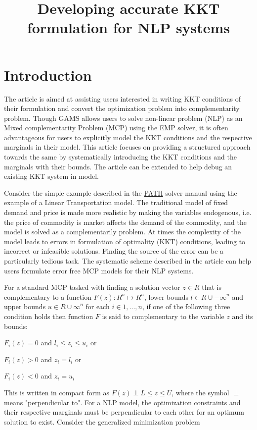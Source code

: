 \documentclass{article}
\title{Developing accurate KKT formulation for NLP systems}
\begin{document}
\section{Introduction}

The article is aimed at assisting users interested in writing KKT conditions of their formulation and convert the optimization problem into
complementarity problem. Though GAMS allows users to solve non-linear problem (NLP) as an Mixed complementarity Problem (MCP) using the
EMP solver, it is often advantageous for users to explicitly model the KKT conditions and the respective marginals in their model.
This article focuses on providing a structured approach towards the same by systematically introducing the KKT
conditions and the marginals with their bounds. The article can be extended to help debug an existing KKT system in model.


Consider the simple example described in the \href{https://www.gams.com/latest/docs/S_PATH.html}{PATH} solver manual using the example of a Linear Transportation model.
The traditional model of fixed demand and price is made more realistic by making the variables endogenous, i.e. the price of commodity is market affects the demand of the
commodity, and the model is solved as a complementarily problem.  At times the complexity of the model leads to errors in formulation of optimality (KKT) conditions,
leading to incorrect or infeasible solutions. Finding the source of the error can be a particularly tedious task. The systematic scheme described in the article can
help users formulate error free MCP models for their NLP systems.

For a standard MCP tasked with finding a solution vector  $z \in \!R$ that is complementary to a function $F(z) : {\!R}^n \mapsto {\!R}^n$,
lower bounds $ l \in { \!R \cup {-\infty}}^n$ and upper bounds $ u \in { \!R \cup {\infty}}^n$ for each $ i \in {1,...,n}$, if one of the following three
condition holds then function $F$ is said to complementary to the variable $z$ and its bounds:

 \centerline{$F_{i}(z) = 0$  and  $ l_i \leq z_i \leq u_i $   or}
 \centerline{$F_{i}(z) > 0$  and  $ z_i = l_i$  or }
 \centerline{ $F_{i}(z) < 0$  and  $ z_i = u_i$ }

\noindent This is written in compact form as $ F(z) \perp L \leq z \leq U $, where the symbol $\perp$ means "perpendicular to". For a NLP model,
the optimization constraints and their respective marginals must be perpendicular to each other for an optimum solution to exist. Consider the
generalized minimization problem
\end{document}
